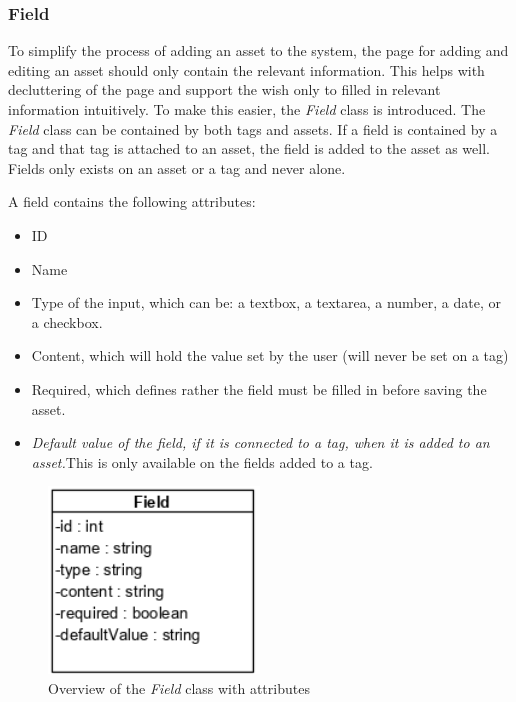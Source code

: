 \subsubsection{Field}
To simplify the process of adding an asset to the system, the page for adding and editing an asset should only contain the relevant information. This helps with decluttering of the page and support the wish only to filled in relevant information intuitively. To make this easier, the \textit{Field} class is introduced. The \textit{Field} class can be contained by both tags and assets. If a field is contained by a tag and that tag is attached to an asset, the field is added to the asset as well. Fields only exists on an asset or a tag and never alone.
\par
A field contains the following attributes:
\begin{itemize}
    \item ID
    \item Name
    \item Type of the input, which can be: a textbox, a textarea, a number, a date, or a checkbox. 
    \item Content, which will hold the value set by the user (will never be set on a tag)
    \item Required, which defines rather the field must be filled in before saving the asset.
    \item \textit{Default value of the field, if it is connected to a tag, when it is added to an asset.}\newline This is only available on the fields added to a tag.
\end{itemize}
\begin{figure}[H]
    \centering
    \includegraphics[width=0.5\textwidth]{figures/Classes/FieldAttributes.png}
    \caption{Overview of the \textit{Field} class with attributes}
    \label{fig:FieldWithAttributes}
\end{figure}

